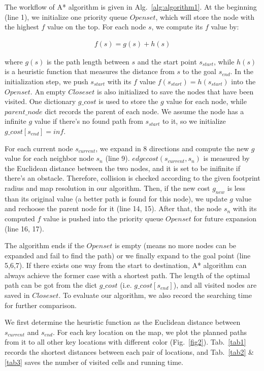 \documentclass[hyperref]{article}
\theoremstyle{nonumberplain}
\begin{document}
The workflow of A* algorithm is given in Alg.~\ref{alg:algorithm1}. At the beginning (line 1), we initialize one priority queue $Openset$, which will store the node with the highest $f$ value on the top. For each node $s$, we compute its $f$ value by:

\begin{equation}
\begin{aligned}
f(s) = g(s) + h(s)
\label{eq1}
\end{aligned}
\end{equation}

where $g(s)$ is the path length between $s$ and the start point $s_{start}$, while $h(s)$ is a heuristic function that measures the distance from $s$ to the goal $s_{end}$. In the initialization step, we push $s_{start}$ with its $f$ value $f(s_{start}) = h(s_{start})$ into the $Openset$. An empty $Closeset$ is also initialized to save the nodes that have been visited. One dictionary $g\_cost$ is used to store the $g$ value for each node, while $parent\_node$ dict records the parent of each node. We assume the node has a infinite $g$ value if there's no found path from $s_{start}$ to it, so we initialize $g\_cost[s_{end}] = inf$.   

For each current node $s_{current}$, we expand in 8 directions and compute the new $g$ value for each neighbor node $s_{n}$ (line 9). $edgecost(s_{current}, s_{n})$ is measured by the Euclidean distance between the two nodes, and it is set to be inifinite if there's an obstacle. Therefore, collision is checked according to the given footprint radius and map resolution in our algorithm. Then, if the new cost $g_{new}$ is less than its original value (a better path is found for this node), we update $g$ value and rechoose the parent node for it (line 14, 15). After that, the node $s_{n}$ with its computed $f$ value is pushed into the priority queue $Openset$ for future expansion (line 16, 17). 

The algorithm ends if the $Openset$ is empty (means no more nodes can be expanded and fail to find the path) or we finally expand to the goal point (line 5,6,7). If there exists one way from the start to destination, A* algorithm can always achieve the former case with a shortest path. The length of the optimal path can be got from the dict $g\_cost$ (i.e. $g\_cost[s_{end}]$), and all visited nodes are saved in $Closeset$. To evaluate our algorithm, we also record the searching time for further comparison. 

We first determine the heuristic function as the Euclidean distance between $s_{current}$ and $s_{end}$. For each key location on the map, we plot the planned paths from it to all other key locations with different color (Fig.~\ref{fig2}). Tab.~\ref{tab1} records the shortest distances between each pair of locations, and Tab.~\ref{tab2} \& \ref{tab3} saves the number of visited cells and running time. 
\end{document}
